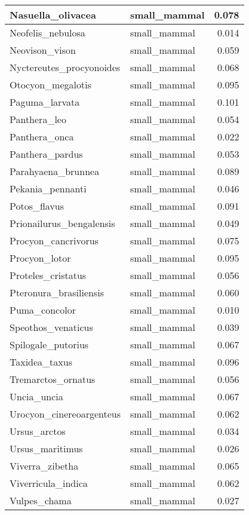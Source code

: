 \begin{table}
\begin{tabular}[t]{l|l|r}
\hline
Nasuella\_olivacea & small\_mammal & 0.078\\
\hline
Neofelis\_nebulosa & small\_mammal & 0.014\\
\hline
Neovison\_vison & small\_mammal & 0.059\\
\hline
Nyctereutes\_procyonoides & small\_mammal & 0.068\\
\hline
Otocyon\_megalotis & small\_mammal & 0.095\\
\hline
Paguma\_larvata & small\_mammal & 0.101\\
\hline
Panthera\_leo & small\_mammal & 0.054\\
\hline
Panthera\_onca & small\_mammal & 0.022\\
\hline
Panthera\_pardus & small\_mammal & 0.053\\
\hline
Parahyaena\_brunnea & small\_mammal & 0.089\\
\hline
Pekania\_pennanti & small\_mammal & 0.046\\
\hline
Potos\_flavus & small\_mammal & 0.091\\
\hline
Prionailurus\_bengalensis & small\_mammal & 0.049\\
\hline
Procyon\_cancrivorus & small\_mammal & 0.075\\
\hline
Procyon\_lotor & small\_mammal & 0.095\\
\hline
Proteles\_cristatus & small\_mammal & 0.056\\
\hline
Pteronura\_brasiliensis & small\_mammal & 0.060\\
\hline
Puma\_concolor & small\_mammal & 0.010\\
\hline
Speothos\_venaticus & small\_mammal & 0.039\\
\hline
Spilogale\_putorius & small\_mammal & 0.067\\
\hline
Taxidea\_taxus & small\_mammal & 0.096\\
\hline
Tremarctos\_ornatus & small\_mammal & 0.056\\
\hline
Uncia\_uncia & small\_mammal & 0.067\\
\hline
Urocyon\_cinereoargenteus & small\_mammal & 0.062\\
\hline
Ursus\_arctos & small\_mammal & 0.034\\
\hline
Ursus\_maritimus & small\_mammal & 0.026\\
\hline
Viverra\_zibetha & small\_mammal & 0.065\\
\hline
Viverricula\_indica & small\_mammal & 0.062\\
\hline
Vulpes\_chama & small\_mammal & 0.027\\

\end{tabular}
\end{table}
